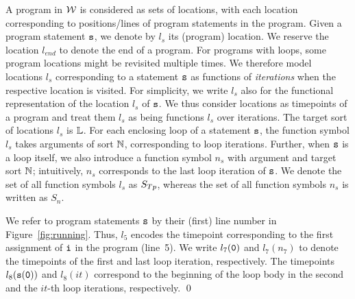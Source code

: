 A program in $\mathcal{W}$ is considered as sets of locations, with
each location corresponding to positions/lines of program
statements in the program. 
Given a program statement $\texttt{s}$, we denote by 
$l_s$ its (program) location. We reserve the location
$l_{\textit{end}}$  to denote 
the end of a program.  
For programs with loops, some program locations might be revisited
multiple times. %
%
We therefore model locations $l_s$ corresponding to a statement
$\texttt{s}$ as functions of \textit{iterations} when the respective location is
visited. For simplicity, we write
$l_s$ also for the functional representation of the location $l_s$ of
$\texttt{s}$. 
We thus consider locations as timepoints of a program and treat them $l_s$ as being functions $l_s$ over
iterations. The target sort of locations $l_s$ is $\mathbb{L}$. 
For each enclosing loop of a statement $\texttt{s}$, 
the function symbol $l_s$ takes arguments of sort $\mathbb{N}$,
corresponding to loop iterations. Further, when $\texttt{s}$ is a loop
itself, we also introduce a function symbol $n_s$ with argument and
target sort $\mathbb{N}$; intuitively, $n_s$ corresponds to the last
loop iteration of $\texttt{s}$. %
%
%
%
%
We denote the set of all function symbols $l_s$ as $S_{Tp}$, whereas
the set of all function symbols $n_s$ is written as  $\textit{S}_{n}$.
%


\noindent\begin{example}\label{ex:locations}
	We refer to program statements $\texttt{s}$
	by their (first) line number in Figure~\ref{fig:running}. %
	Thus, $l_5$ encodes the timepoint corresponding to the first
	assignment of $\texttt{i}$ in the program (line~5). We write $l_{7}({\tt 0})$ and
	$l_{7}(n_{7})$ to denote the timepoints of the first and last loop iteration, respectively. The timepoints  
	$l_{8}({\tt s}({\tt 0}))$ and $l_{8}(it)$ correspond to the beginning of
	the loop body in the second and the $it$-th
	loop iterations, respectively. \qed
\end{example}

